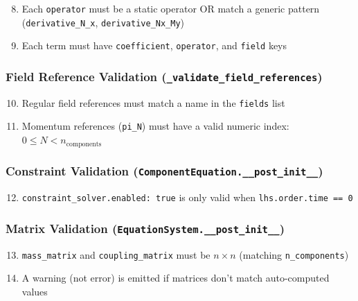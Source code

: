 \begin{enumerate}
  \setcounter{enumi}{7}
  \item Each \texttt{operator} must be a static operator OR match a generic pattern (\texttt{derivative\_N\_x}, \texttt{derivative\_Nx\_My})
  \item Each term must have \texttt{coefficient}, \texttt{operator}, and \texttt{field} keys
\end{enumerate}

\subsubsection{Field Reference Validation (\texttt{\_validate\_field\_references})}
\label{sec:json-validation-field-ref}

\begin{enumerate}
  \setcounter{enumi}{9}
  \item Regular field references must match a name in the \texttt{fields} list
  \item Momentum references (\texttt{pi\_N}) must have a valid numeric index: $0 \leq N < n_\text{components}$
\end{enumerate}

\subsubsection{Constraint Validation (\texttt{ComponentEquation.\_\_post\_init\_\_})}
\label{sec:json-validation-constraint}

\begin{enumerate}
  \setcounter{enumi}{11}
  \item \texttt{constraint\_solver.enabled: true} is only valid when \texttt{lhs.order.time == 0}
\end{enumerate}

\subsubsection{Matrix Validation (\texttt{EquationSystem.\_\_post\_init\_\_})}
\label{sec:json-validation-matrix}

\begin{enumerate}
  \setcounter{enumi}{12}
  \item \texttt{mass\_matrix} and \texttt{coupling\_matrix} must be $n \times n$ (matching \texttt{n\_components})
  \item A warning (not error) is emitted if matrices don't match auto-computed values
\end{enumerate}


